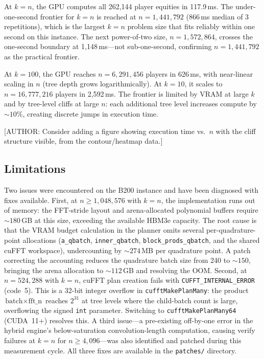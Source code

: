 \documentclass[11pt]{article}
\begin{document}
At $k = n$, the GPU computes all 262{,}144 player equities in
117.9\,ms. The under-one-second frontier for $k = n$ is reached at
$n = 1{,}441{,}792$ (866\,ms median of 3 repetitions), which is the largest
$k = n$ problem size that fits reliably within one second on this instance.
The next power-of-two size, $n = 1{,}572{,}864$, crosses the one-second
boundary at 1{,}148\,ms---not sub-one-second, confirming
$n = 1{,}441{,}792$ as the practical frontier.

At $k = 100$, the GPU reaches $n = 6{,}291{,}456$ players in
626\,ms, with near-linear scaling in $n$ (tree depth grows
logarithmically). At $k = 10$, it scales to $n = 16{,}777{,}216$
players in 2{,}592\,ms. The frontier is limited by VRAM at large
$k$ and by tree-level cliffs at large $n$: each additional tree
level increases compute by ${\sim}10\%$, creating discrete jumps
in execution time.

[AUTHOR: Consider adding a figure showing execution time vs.\ $n$ with
the cliff structure visible, from the contour/heatmap data.]

\subsection{Limitations}

Two issues were encountered on the B200 instance and have been diagnosed
with fixes available. First, at $n \ge 1{,}048{,}576$ with $k = n$, the
implementation runs out of memory: the FFT-stride layout and arena-allocated
polynomial buffers require ${\sim}180$\,GB at this size, exceeding the
available HBM3e capacity. The root cause is that the VRAM budget calculation
in the planner omits several per-quadrature-point allocations
(\texttt{a\_qbatch}, \texttt{inner\_qbatch}, \texttt{block\_prods\_qbatch},
and the shared cuFFT workspace), undercounting by ${\sim}274$\,MB per
quadrature point. A patch correcting the accounting reduces the quadrature
batch size from 240 to ${\sim}150$, bringing the arena allocation to
${\sim}112$\,GB and resolving the OOM. Second, at $n = 524{,}288$ with
$k = n$, cuFFT plan creation fails with \texttt{CUFFT\_INTERNAL\_ERROR}
(code~5). This is a 32-bit integer overflow in \texttt{cufftMakePlanMany}:
the product $\text{batch} \times \text{fft\_n}$ reaches $2^{31}$ at tree
levels where the child-batch count is large, overflowing the signed
\texttt{int} parameter. Switching to \texttt{cufftMakePlanMany64} (CUDA~11+)
resolves this. A third issue---a pre-existing off-by-one error in the hybrid
engine's below-saturation convolution-length computation, causing verify
failures at $k = n$ for $n \ge 4{,}096$---was also identified and patched
during this measurement cycle. All three fixes are available in the
\texttt{patches/} directory.
\end{document}
